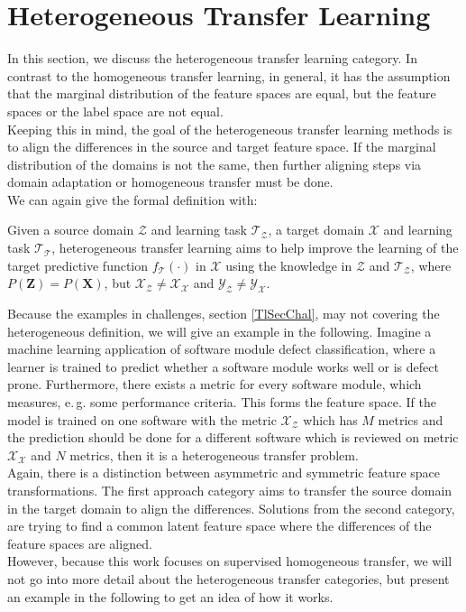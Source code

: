 \section{Heterogeneous Transfer Learning}\label{TlSecHetero}
In this section, we discuss the heterogeneous transfer learning category.
In contrast to the homogeneous transfer learning, in general, it has the assumption that the marginal distribution of the feature spaces are equal, but the feature spaces or the label space are not equal.\cite[p. 4]{Weiss.2016}\\
Keeping this in mind, the goal of the heterogeneous transfer learning methods is to align the differences in the source and target feature space.
If the marginal distribution of the domains is not the same, then further aligning steps via domain adaptation or homogeneous transfer must be done.
\cite[p. 6]{Weiss.2016}\\
We can again give the formal definition with:
\begin{mDef}
	Given a source domain $\mathcal{Z}$ and learning task $\mathcal{T_Z}$, a target domain $\mathcal{X}$ and learning task $\mathcal{T_T}$, heterogeneous transfer learning aims to help improve the learning of the target predictive function $f_\mathcal{T}(\cdot)$ in $\mathcal{X}$ using the knowledge in $\mathcal{Z}$ and $\mathcal{T_Z}$, where $P(\mathbf{Z}) = P(\mathbf{X})$, but $\mathcal{X_Z} \neq \mathcal{X_X}$ and $\mathcal{Y_Z} \neq \mathcal{Y_X} $.\cite[p. 4]{Weiss.2016}
\end{mDef}
Because the examples in challenges, section \ref{TlSecChal}, may not covering the heterogeneous definition, we will give an example in the following.
Imagine a machine learning application of software module defect classification, where a learner is trained to predict whether a software module works well or is defect prone.
Furthermore, there exists a metric for every software module, which measures, e.\,g. some performance criteria.
This forms the feature space.
If the model is trained on one software with the metric $\mathcal{X_Z}$ which has $M$ metrics and the prediction should be done for a different software which is reviewed on metric $\mathcal{X_X}$ and $N$ metrics, then it is a heterogeneous transfer problem.\cite[p 3-4]{Weiss.2016}\\
Again, there is a distinction between asymmetric and symmetric feature space transformations.
The first approach category aims to transfer the source domain in the target domain to align the differences.
Solutions from the second category, are trying to find a common latent feature space where the differences of the feature spaces are aligned.\cite[p. 19]{Weiss.2016}\\
However, because this work focuses on supervised homogeneous transfer, we will not go into more detail about the heterogeneous transfer categories, but present an example in the following to get an idea of how it works.\\
